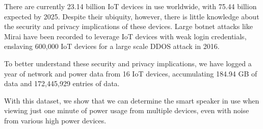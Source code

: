 There are currently 23.14 billion IoT devices in use worldwide, with 75.44 billion expected by 2025. Despite their ubiquity, however, there is little knowledge about the security and privacy implications of these devices. Large botnet attacks like Mirai have been recorded to leverage IoT devices with weak login credentials, enslaving 600,000 IoT devices for a large scale DDOS attack in 2016.

To better understand these security and privacy implications, we have logged a year of network and power data from 16 IoT devices, accumulating 184.94 GB of data and 172,445,929 entries of data.

With this dataset, we show that we can determine the smart speaker in use when viewing just one minute of power usage from multiple devices, even with noise from various high power devices.
